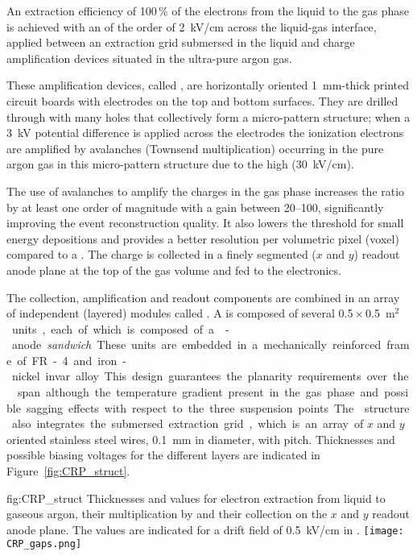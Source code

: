 An extraction efficiency of \num{100}\,\% of the electrons from the liquid to the gas phase is achieved with an \efield of the order of \SI{2}{kV/cm} across the liquid-gas interface, applied between an  extraction grid submersed in the liquid and charge amplification  devices situated in the ultra-pure argon gas. 

These amplification devices, called , are horizontally  oriented \SI{1}{mm}-thick printed  circuit boards with electrodes on the top and bottom surfaces. They are drilled through with many holes that collectively form a micro-pattern structure;  when a \SI{3}{kV} potential difference is applied across the electrodes the ionization electrons are amplified by avalanches (Townsend multiplication) occurring in the  pure argon gas in this micro-pattern structure due to the high \efield (\SI{30}{kV/cm}).

The use of avalanches to amplify the charges in the gas phase increases the  ratio by at least one order of magnitude with a  gain between \numrange{20}{100}, significantly improving the event reconstruction quality. It also lowers the threshold for small energy depositions and provides a better resolution per volumetric pixel (voxel) compared to a \single \lartpc.  The charge is collected in a finely segmented \twod ($x$ and $y$) readout anode plane at the top of the gas volume and fed to the  electronics.   

The  collection, amplification and readout components are combined in an array of independent (layered) modules called . A  is  composed of several \num{0.5}\,$\times$\,\SI{0.5}{m$^2$} units, each of which is composed  of a -anode \textit{sandwich}.  These units are embedded in a mechanically reinforced frame of FR-4 and iron-nickel invar alloy. This design guarantees the planarity requirements over the  span although the temperature gradient present in the gas phase and possible sagging effects with respect to the three suspension points. The  structure also integrates  the submersed extraction grid, which is an array of $x$ and $y$ oriented stainless steel wires, \SI{0.1}{mm} in diameter, with \dpstrippitch pitch. Thicknesses and possible biasing voltages for the different layers are indicated in Figure~\ref{fig:CRP_struct}.

\begin{dunefigure}{fig:CRP_struct}
{Thicknesses and  values for electron extraction from liquid to gaseous argon, their  multiplication by  and their collection on the $x$ and $y$ readout anode plane. The  values are indicated for a drift field of \SI{0.5}{kV/cm} in \lar.}
\texttt{[image: CRP\_gaps.png]}
\end{dunefigure}

